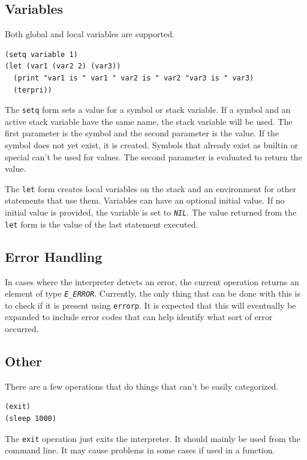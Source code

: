 \documentclass[10pt, openany]{book}
\newcommand{\function}[1]{\texttt{#1}}
\newcommand{\constant}[1]{\emph{\texttt{#1}}}
\newcommand{\keyword}[1]{\texttt{#1}}
\begin{document}
\subsection{Variables}
Both global and local variables are supported.
\begin{lstlisting}
(setq variable 1)
(let (var1 (var2 2) (var3))
  (print "var1 is " var1 " var2 is " var2 "var3 is " var3)
  (terpri))
\end{lstlisting}

The \function{setq} form sets a value for a symbol or stack variable.  If a symbol and an active stack variable have the same name, the stack variable will be used.  The first parameter is the symbol and the second parameter is the value.  If the symbol does not yet exist, it is created.  Symbols that already exist as builtin or special can't be used for values.  The second parameter is evaluated to return the value.

The \function{let} form creates local variables on the stack and an environment for other statements that use them.  Variables can have an optional initial value.  If no initial value is provided, the variable is set to \constant{NIL}.  The value returned from the \function{let} form is the value of the last statement executed.

\subsection{Error Handling}
In cases where the interpreter detects an error, the current operation returns an element of type \constant{E\_ERROR}.  Currently, the only thing that can be done with this is to check if it is present using \keyword{errorp}.  It is expected that this will eventually be expanded to include error codes that can help identify what sort of error occurred.

\subsection{Other}
There are a few operations that do things that can't be easily categorized.

\begin{lstlisting}
(exit)
(sleep 1000)
\end{lstlisting}

The \function{exit} operation just exits the interpreter.  It should mainly be used from the command line.  It may cause problems in some cases if used in a function.
\end{document}

